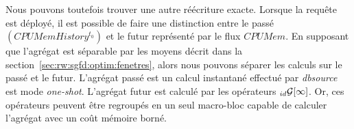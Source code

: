 Nous pouvons toutefois trouver une autre réécriture exacte. Lorsque la requête est déployé, il est possible de faire une distinction entre le passé $(CPUMemHistory^{t_0})$ et le futur représenté par le flux $CPUMem$. En supposant que l'agrégat est séparable par les moyens décrit dans la section~\ref{sec:rw:sgfd:optim:fenetres}, alors nous pouvons séparer les calculs sur le passé et le futur. L'agrégat passé est un calcul instantané effectué par \textit{dbsource} est mode \textit{one-shot}. L'agrégat futur est calculé par les opérateurs $_{id}\mathcal{G}[\infty]$. Or, ces opérateurs peuvent être regroupés en un seul macro-bloc capable de calculer l'agrégat avec un coût mémoire borné.